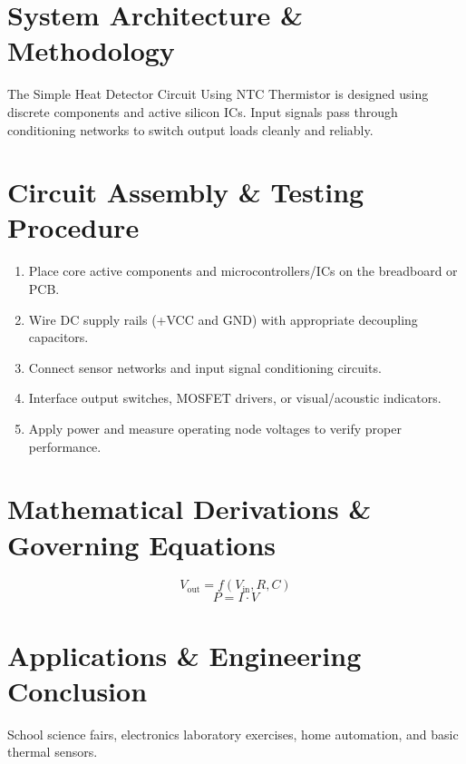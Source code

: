 \documentclass[11pt,a4paper]{article}
\begin{document}
\section{System Architecture \& Methodology}
The Simple Heat Detector Circuit Using NTC Thermistor is designed using discrete components and active silicon ICs. Input signals pass through conditioning networks to switch output loads cleanly and reliably.

\section{Circuit Assembly \& Testing Procedure}
\begin{enumerate}
    \item Place core active components and microcontrollers/ICs on the breadboard or PCB.
    \item Wire DC supply rails (+VCC and GND) with appropriate decoupling capacitors.
    \item Connect sensor networks and input signal conditioning circuits.
    \item Interface output switches, MOSFET drivers, or visual/acoustic indicators.
    \item Apply power and measure operating node voltages to verify proper performance.
\end{enumerate}

\section{Mathematical Derivations \& Governing Equations}
\begin{equation}
V_{\text{out}} = f(V_{\text{in}}, R, C)
\end{equation}
\begin{equation}
P = I \cdot V
\end{equation}

\section{Applications \& Engineering Conclusion}
School science fairs, electronics laboratory exercises, home automation, and basic thermal sensors.
\end{document}
